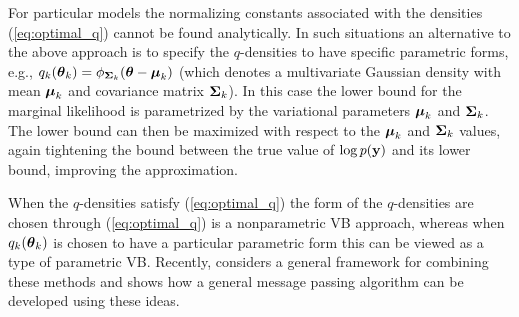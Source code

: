 For particular models the normalizing constants associated with the densities
(\ref{eq:optimal_q}) cannot be found analytically. In such situations
an alternative to the above approach is to specify the $q$-densities  to have specific
parametric forms, e.g., $q_k({\boldsymbol \theta}_k) = \phi_{{\boldsymbol \Sigma}_k}({\boldsymbol \theta} - {\boldsymbol \mu}_k)$
(which denotes a multivariate Gaussian density with
mean ${\boldsymbol \mu}_k$ and covariance matrix ${\boldsymbol \Sigma}_k$). In this case the  
lower bound for the marginal likelihood is parametrized by the variational
parameters ${\boldsymbol \mu}_k$ and ${\boldsymbol \Sigma}_k$. The lower bound can then be maximized
with respect to the ${\boldsymbol \mu}_k$ and ${\boldsymbol \Sigma}_k$ values, again tightening the bound
between the true value of $\log p({\bf y})$ and its lower bound, improving the
approximation. 

When the $q$-densities satisfy (\ref{eq:optimal_q}) the form of the $q$-densities
are chosen through  (\ref{eq:optimal_q}) is a nonparametric VB
approach,
whereas when $q_k({\boldsymbol \theta}_k)$ is chosen to have a particular parametric form
this can be viewed as a type of parametric VB. Recently, \cite{Wand2017} considers
a general framework for combining these methods and shows how a general message passing algorithm can be developed using these ideas.




